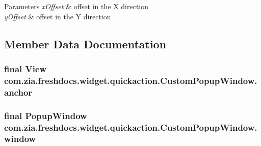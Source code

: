 \begin{DoxyParams}{Parameters}
{\em x\-Offset} & offset in the X direction \\
\hline
{\em y\-Offset} & offset in the Y direction \\
\hline
\end{DoxyParams}


\subsection{Member Data Documentation}
\hypertarget{classcom_1_1zia_1_1freshdocs_1_1widget_1_1quickaction_1_1_custom_popup_window_a2ddc37724854869179d0c674580dce1b}{
\subsubsection[{anchor}]{\setlength{\rightskip}{0pt plus 5cm}final View com.\-zia.\-freshdocs.\-widget.\-quickaction.\-Custom\-Popup\-Window.\-anchor\hspace{0.3cm}{\ttfamily [protected]}}}\label{classcom_1_1zia_1_1freshdocs_1_1widget_1_1quickaction_1_1_custom_popup_window_a2ddc37724854869179d0c674580dce1b}
\hypertarget{classcom_1_1zia_1_1freshdocs_1_1widget_1_1quickaction_1_1_custom_popup_window_abb4ee081dc8ab0b1f0760588753e359d}{
\subsubsection[{window}]{\setlength{\rightskip}{0pt plus 5cm}final Popup\-Window com.\-zia.\-freshdocs.\-widget.\-quickaction.\-Custom\-Popup\-Window.\-window\hspace{0.3cm}{\ttfamily [protected]}}}\label{classcom_1_1zia_1_1freshdocs_1_1widget_1_1quickaction_1_1_custom_popup_window_abb4ee081dc8ab0b1f0760588753e359d}
